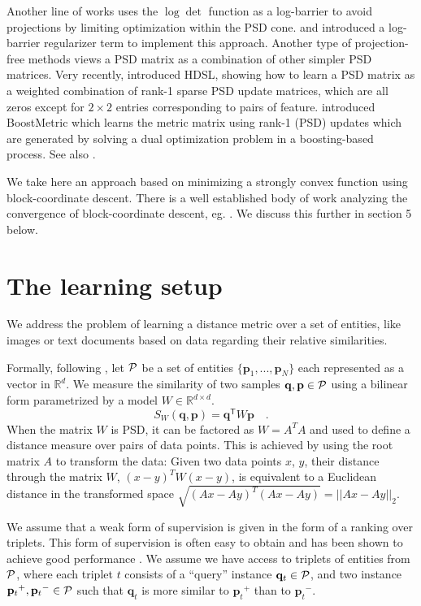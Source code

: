 \documentclass{article} %
\newcommand\mat[1]{{#1}}
\renewcommand\vec[1]{\mathbf{#1}}
\newcommand{\T}{{}^\mathsf{T}}
\newcommand{\W}{\mat{W}}
\newcommand{\Rd}{\mathbb{R}^d}
\newcommand{\q}{{\vec{q}}}
\newcommand{\p}{{\vec{p}}}
\newcommand{\trip}{{t}}
\newcommand{\qt}{{\q_{\trip}}}
\newcommand{\pt}{{\p_{\trip}}}
\begin{document}
Another line of works uses the $\log \det$ function as a log-barrier to avoid projections by limiting optimization within the PSD cone. \citet{davis2007information} and \citet{lego} introduced a log-barrier regularizer term to implement this approach. Another type of projection-free methods views a PSD matrix as a combination of other simpler PSD matrices. Very recently, \citet{hdsl} introduced HDSL, showing how to learn a PSD matrix as a weighted combination of rank-1 sparse PSD update matrices, which are all zeros except for $2\times2$ entries corresponding to pairs of feature. \citet{boost} introduced BoostMetric which learns the metric matrix using rank-1 (PSD) updates which are generated by solving a dual optimization problem in a boosting-based process. See also \citet{bi2011adaboost, liu2012robust}.

We take here an approach based on minimizing a strongly convex function using block-coordinate descent. There is a well established body of work analyzing the convergence of block-coordinate descent, eg. \cite{nesterov2012efficiency,richtarik2014iteration}. We discuss this further in section 5 below.


\section{The learning setup}
We address the problem of learning a distance metric over a set of
entities, like images or text documents based on data regarding their
relative similarities.

Formally, following \citet{OASIS}, let $\cal{P}$ be a set of entities
$\{\p_1,...,\p_N\}$ each represented as a vector in $\Rd$. We measure
the similarity of two samples $\q, \p \in \cal{P}$ using a bilinear
form parametrized by a model $\W \in \mathbb{R}^{d \times d}$.
\begin{equation}
  S_{\W}(\q, \p) = \q\T \W \p \quad.
\end{equation}
When the matrix $\W$ is PSD, it can be factored as $\W = A^TA$ and used to define a distance measure over pairs of data points. This is achieved by using the root matrix $A$ to transform the data: Given two data points $x$, $y$, their distance through the matrix $\W$, $(x-y)^T\W(x-y)$, is equivalent to a Euclidean distance in the transformed space $\sqrt{(Ax-Ay)^T(Ax-Ay)} = ||Ax-Ay||_2$. 

We assume that a weak form of supervision is given in the form of a
ranking over triplets. This form of supervision is often easy
to obtain and has been shown to achieve good performance
\cite{weinberger2006dml,OASIS,qian}. We assume we have access to
triplets of entities from $\cal{P}$, where each triplet $t$ consists of
a ``query'' instance $\qt \in \cal{P}$, and two instance $\pt^{+}, \pt^{-} \in \cal{P}$ such that $\qt$ is more similar to $\pt^{+}$
than to $\pt^{-}$.
\end{document}
